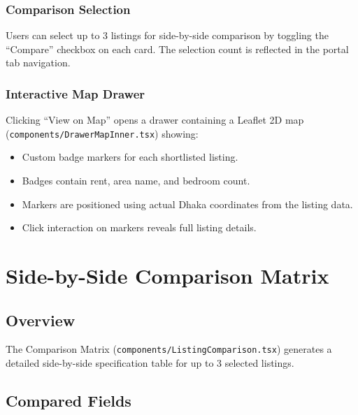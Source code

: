 \documentclass[12pt, a4paper, oneside]{report}
\newcommand{\filepath}[1]{\texttt{\small\color{codeblue}#1}}
\begin{document}
\subsection{Comparison Selection}

Users can select up to 3 listings for side-by-side comparison by toggling the ``Compare'' checkbox on each card. The selection count is reflected in the portal tab navigation.

\subsection{Interactive Map Drawer}

Clicking ``View on Map'' opens a drawer containing a Leaflet 2D map (\filepath{components/DrawerMapInner.tsx}) showing:

\begin{itemize}[leftmargin=2em]
  \item Custom badge markers for each shortlisted listing.
  \item Badges contain rent, area name, and bedroom count.
  \item Markers are positioned using actual Dhaka coordinates from the listing data.
  \item Click interaction on markers reveals full listing details.
\end{itemize}


\chapter{Side-by-Side Comparison Matrix}

\section{Overview}

The Comparison Matrix (\filepath{components/ListingComparison.tsx}) generates a detailed side-by-side specification table for up to 3 selected listings.

\section{Compared Fields}
\end{document}
